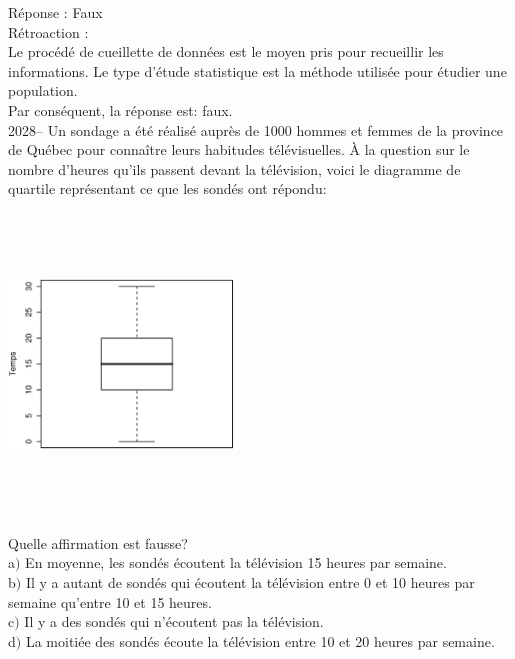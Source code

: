 \documentclass[letterpaper, 12pt]{article}
\begin{document}
R\'eponse : Faux\\

R\'etroaction :\\
Le proc\'ed\'e de cueillette de donn\'ees est le moyen pris pour recueillir les informations. Le type d'\'etude statistique est la m\'ethode utilis\'ee pour \'etudier une population.\\
Par cons\'equent, la r\'eponse est: faux.\\


2028-- Un sondage a \'et\'e r\'ealis\'e aupr\`es de 1000 hommes et femmes de la province de Qu\'ebec pour conna\^itre leurs habitudes t\'el\'evisuelles. \`A la question sur le nombre d'heures qu'ils passent devant la t\'el\'evision, voici le diagramme de quartile repr\'esentant ce que les sond\'es ont r\'epondu:
\begin{center}
 \includegraphics[width=6cm,height=8cm,angle=-90]{Q2028.eps}
\end{center}

Quelle affirmation est fausse?\\

a$)$ En moyenne, les sond\'es \'ecoutent la t\'el\'evision 15 heures par semaine.\\
b$)$ Il y a autant de sond\'es qui \'ecoutent la t\'el\'evision entre 0 et 10 heures par semaine qu'entre 10 et 15 heures.\\
c$)$ Il y a des sond\'es qui n'\'ecoutent pas la t\'el\'evision.\\
d$)$ La moiti\'ee des sond\'es \'ecoute la t\'el\'evision entre 10 et 20 heures par semaine.\\
\end{document}
